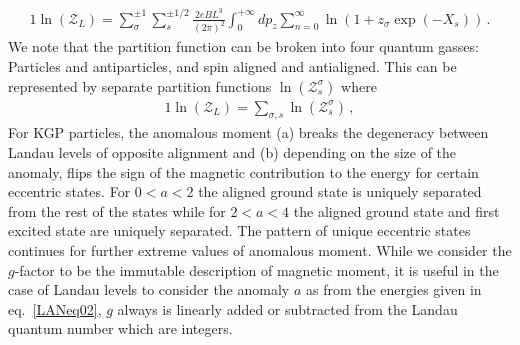 \begin{alignat}{1}
    \label{PartFuncOne} \ln\left(\mathcal{Z}_{L}\right)=\sum_{\sigma}^{\pm1}\sum_{s}^{\pm1/2}\frac{2eBL^{3}}{(2\pi)^{2}}\int^{+\infty}_{0}dp_{z}\sum_{n=0}^{\infty}\ln\left(1+z_{\sigma}\exp(-X_{s})\right)\,.
\end{alignat}
We note that the partition function can be broken into four quantum gasses: Particles and antiparticles, and spin aligned and antialigned. This can be represented by separate partition functions $\ln\left(\mathcal{Z}^{\sigma}_{s}\right)$ where
\begin{alignat}{1}
    \label{FourGasses} \ln\left(\mathcal{Z}_{L}\right)=\sum_{\sigma,s}\ln\left(\mathcal{Z}^{\sigma}_{s}\right)\,,
\end{alignat}
For KGP particles, the anomalous moment (a) breaks the degeneracy between Landau levels of opposite alignment and (b) depending on the size of the anomaly, flips the sign of the magnetic contribution to the energy for certain eccentric states. For $0<a<2$ the aligned ground state is uniquely separated from the rest of the states while for $2<a<4$ the aligned ground state and first excited state are uniquely separated. The pattern of unique eccentric states continues for further extreme values of anomalous moment. While we consider the $g$-factor to be the immutable description of magnetic moment, it is useful in the case of Landau levels to consider the anomaly $a$ as from the energies given in eq.~\eqref{LANeq02}, $g$ always is linearly added or subtracted from the Landau quantum number which are integers.

